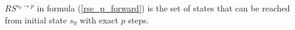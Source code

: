 \documentclass[journal]{IEEEtran}
\begin{document}
\begin{equation}\label{rse}
\end{equation}
%
%
%
%
%
%
$RS^{s_0\to p}$ in formula (\ref{rse_p_forward}) is the set of states that can be reached from initial state $s_0$ with exact $p$ steps.

\end{document}
